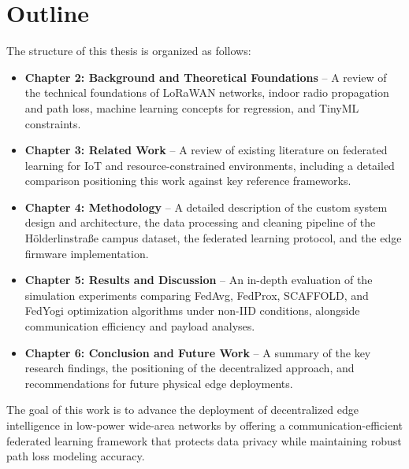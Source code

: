 \section{Outline}
\label{sec:outline}
The structure of this thesis is organized as follows:
\begin{itemize}
  \item \textbf{Chapter 2: Background and Theoretical Foundations} -- A review of the technical foundations of LoRaWAN networks, indoor radio propagation and path loss, machine learning concepts for regression, and TinyML constraints.
  \item \textbf{Chapter 3: Related Work} -- A review of existing literature on federated learning for IoT and resource-constrained environments, including a detailed comparison positioning this work against key reference frameworks.
  \item \textbf{Chapter 4: Methodology} -- A detailed description of the custom system design and architecture, the data processing and cleaning pipeline of the Hölderlinstraße campus dataset, the federated learning protocol, and the edge firmware implementation.
  \item \textbf{Chapter 5: Results and Discussion} -- An in-depth evaluation of the simulation experiments comparing FedAvg, FedProx, SCAFFOLD, and FedYogi optimization algorithms under non-IID conditions, alongside communication efficiency and payload analyses.
  \item \textbf{Chapter 6: Conclusion and Future Work} -- A summary of the key research findings, the positioning of the decentralized approach, and recommendations for future physical edge deployments.
\end{itemize}

The goal of this work is to advance the deployment of decentralized edge intelligence in low-power wide-area networks by offering a communication-efficient federated learning framework that protects data privacy while maintaining robust path loss modeling accuracy.
